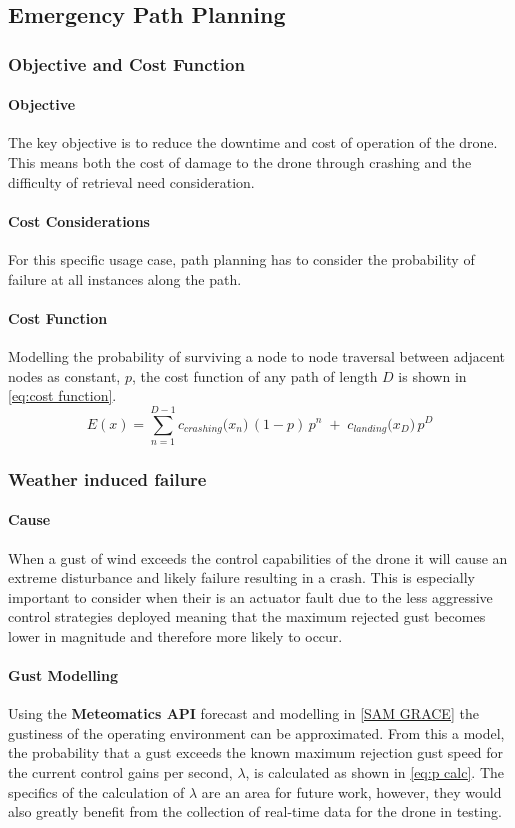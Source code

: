 \subsection{Emergency Path Planning}

\subsubsection{Objective and Cost Function}
\paragraph{Objective}
The key objective is to reduce the downtime and cost of operation of the drone. This means both the cost of damage to the drone through crashing and the difficulty of retrieval need consideration.
\paragraph{Cost Considerations}
For this specific usage case, path planning has to consider the probability of failure at all instances along the path. 
\paragraph{Cost Function}
Modelling the probability of surviving a node to node traversal between adjacent nodes as constant, $p$, the cost function of any path of length $D$ is shown in \ref{eq:cost function}.
\begin{equation}\label{eq:cost function}
    E(x) 
    = \sum_{n=1}^{D-1} c_{crashing}\bigl(x_n\bigr)\, (1-p) \,p^n 
    \;+\; c_{landing}\bigl(x_D\bigr)\, p^D
\end{equation}

\subsubsection{Weather induced failure}
\paragraph{Cause}
When a gust of wind exceeds the control capabilities of the drone it will cause an extreme disturbance and likely failure resulting in a crash. This is especially important to consider when their is an actuator fault due to the less aggressive control strategies deployed meaning that the maximum rejected gust becomes lower in magnitude and therefore more likely to occur. 
\paragraph{Gust Modelling}
Using the \textbf{Meteomatics API} forecast and modelling in \ref{SAM GRACE} the gustiness of the operating environment can be approximated. From this a model, the probability that a gust exceeds the known maximum rejection gust speed for the current control gains per second, $\lambda$, is calculated as shown in \ref{eq:p calc}. The specifics of the calculation of $\lambda$ are an area for future work, however, they would also greatly benefit from the collection of real-time data for the drone in testing.


